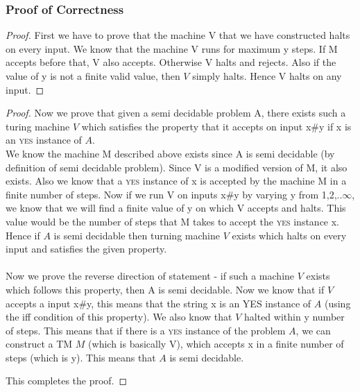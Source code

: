 \documentclass[11pt]{article}
\begin{document}
\subsubsection{Proof of Correctness}
\begin{proof}
First we have to prove that the machine V that we have constructed halts on every input. We know that the machine V runs for maximum y steps. If M accepts before that, V also accepts. Otherwise V halts and rejects. Also if the value of y is not a finite valid value, then $V$ simply halts. Hence V halts on any input.
\end{proof}
\begin{proof}
Now we prove that given a semi decidable problem A, there exists such a turing machine $V$ which satisfies the property that it accepts on input x\#y if x is an \textsc{yes} instance of $A$. \\We know the machine M described above exists since A is semi decidable (by definition of semi decidable problem). Since V is a modified version of M, it also exists. Also we know that a \textsc{yes} instance of x is accepted by the machine M in a finite number of steps. Now if we run V on inputs x\#y by varying y from 1,2,..$\infty$, we know that we will find a finite value of y on which V accepts and halts. This value would be the number of steps that M takes to accept the \textsc{yes} instance x. Hence if $A$ is semi decidable then turning machine $V$ exists which halts on every input and satisfies the given property.\\\\
Now we prove the reverse direction of statement - if such a machine $V$ exists which follows this property, then A is semi decidable. Now we know that if $V$ accepts a input x\#y, this means that the string x is an \textsc{YES} instance of $A$ (using the iff condition of this property). We also know that $V$ halted within y number of steps. This means that if there is a \textsc{yes} instance of the problem $A$, we can construct a TM $M$ (which is basically V), which accepts x in a finite number of steps (which is y). This means that $A$ is semi decidable.

This completes the proof.
\end{proof}
\end{document}
